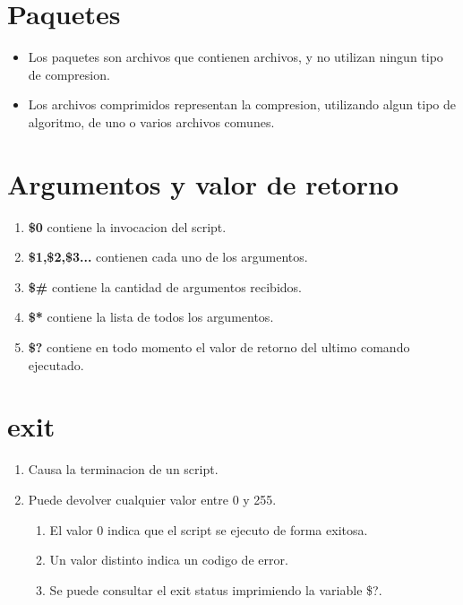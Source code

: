 \documentclass[11pt]{article}
\begin{document}
\section{Paquetes}
\begin{itemize}
    \item Los paquetes son archivos que contienen archivos, y no utilizan ningun tipo de compresion.
    \item Los archivos comprimidos representan la compresion, utilizando algun tipo de algoritmo, de uno o varios archivos comunes.
\end{itemize}

\section{Argumentos y valor de retorno}
\begin{enumerate}
    \item \textbf{\$0} contiene la invocacion del script.
    \item \textbf{\$1,\$2,\$3...} contienen cada uno de los argumentos.
    \item \textbf{\$\#} contiene la cantidad de argumentos recibidos.
    \item \textbf{\$*} contiene la lista de todos los argumentos.
    \item \textbf{\$?} contiene en todo momento el valor de retorno del ultimo comando ejecutado.
\end{enumerate}

\section{exit}
\begin{enumerate}
    \item Causa la terminacion de un script.
    \item Puede devolver cualquier valor entre 0 y 255.
    \begin{enumerate}
        \item El valor 0 indica que el script se ejecuto de forma exitosa.
        \item Un valor distinto indica un codigo de error.
        \item Se puede consultar el exit status imprimiendo la variable \$?.
    \end{enumerate}
\end{enumerate}
\end{document}
